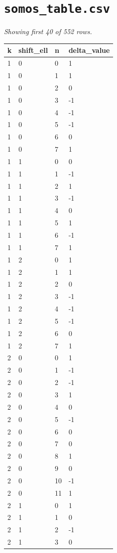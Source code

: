 \documentclass[10pt]{article}
\begin{document}
\section*{\texttt{somos\_table.csv}}
\noindent\textit{Showing first 40 of 552 rows.}\par\medskip
{\footnotesize
\begin{longtable}{@{}llll@{}}
\toprule
\textbf{k} & \textbf{shift\_ell} & \textbf{n} & \textbf{delta\_value} \\
\midrule\endhead
1 & 0 & 0 & 1 \\
1 & 0 & 1 & 1 \\
1 & 0 & 2 & 0 \\
1 & 0 & 3 & -1 \\
1 & 0 & 4 & -1 \\
1 & 0 & 5 & -1 \\
1 & 0 & 6 & 0 \\
1 & 0 & 7 & 1 \\
1 & 1 & 0 & 0 \\
1 & 1 & 1 & -1 \\
1 & 1 & 2 & 1 \\
1 & 1 & 3 & -1 \\
1 & 1 & 4 & 0 \\
1 & 1 & 5 & 1 \\
1 & 1 & 6 & -1 \\
1 & 1 & 7 & 1 \\
1 & 2 & 0 & 1 \\
1 & 2 & 1 & 1 \\
1 & 2 & 2 & 0 \\
1 & 2 & 3 & -1 \\
1 & 2 & 4 & -1 \\
1 & 2 & 5 & -1 \\
1 & 2 & 6 & 0 \\
1 & 2 & 7 & 1 \\
2 & 0 & 0 & 1 \\
2 & 0 & 1 & -1 \\
2 & 0 & 2 & -1 \\
2 & 0 & 3 & 1 \\
2 & 0 & 4 & 0 \\
2 & 0 & 5 & -1 \\
2 & 0 & 6 & 0 \\
2 & 0 & 7 & 0 \\
2 & 0 & 8 & 1 \\
2 & 0 & 9 & 0 \\
2 & 0 & 10 & -1 \\
2 & 0 & 11 & 1 \\
2 & 1 & 0 & 1 \\
2 & 1 & 1 & 0 \\
2 & 1 & 2 & -1 \\
2 & 1 & 3 & 0 \\
\bottomrule
\end{longtable}}
\end{document}
